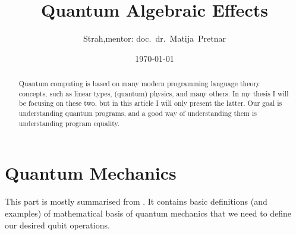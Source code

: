 \documentclass[a4paper]{article}
\title{Quantum Algebraic Effects}
\author{Strah,\quad mentor: doc.~dr.~Matija~Pretnar}
\date{\today}
\begin{document}
\maketitle

\begin{abstract}

    Quantum computing is based on many modern programming language theory concepts,
    such as linear types, (quantum) physics, and many others.
    In my thesis I will be focusing on these two, but in this article I will only present the latter.
    Our goal is understanding quantum programs,
    and a good way of understanding them is understanding program equality.


\end{abstract}


\section{Quantum Mechanics}

This part is mostly summarised from \cite{ess-qc}.
It contains basic definitions (and examples) of mathematical basis of quantum mechanics
that we need to define our desired qubit operations.
\end{document}
